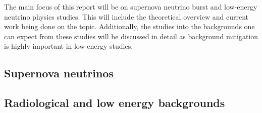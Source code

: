 \noindent The main focus of this report will be on supernova neutrino burst and low-energy neutrino physics studies. 
This will include the theoretical overview and current work being done on the topic.
Additionally, the studies into the backgrounds one can expect from these studies will be discussed in detail as background mitigation is highly important in low-energy studies.




















\subsection{Supernova neutrinos}
\subsection{Radiological and low energy backgrounds}

